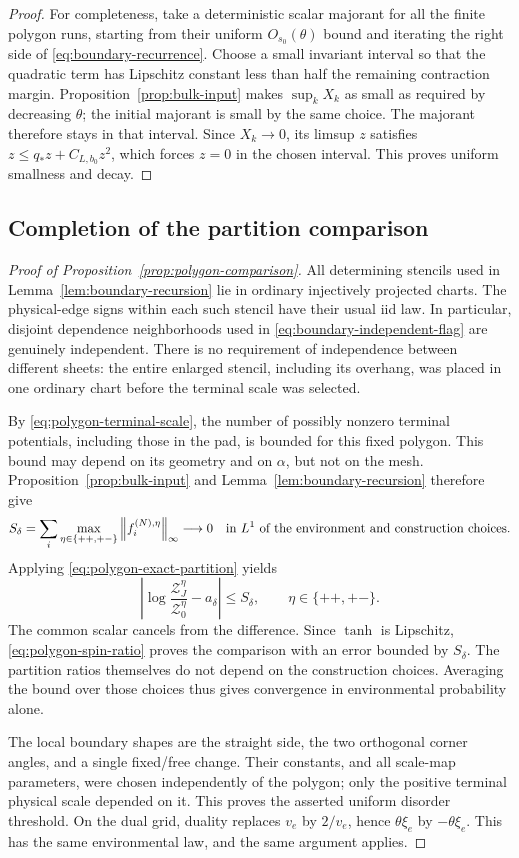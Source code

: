 \begin{proof}
For completeness, take a deterministic scalar majorant for all the
finite polygon runs, starting from their uniform $O_{s_0}(\theta)$
bound and iterating the right side of
\eqref{eq:boundary-recurrence}.  Choose a small invariant interval so
that the quadratic term has Lipschitz constant less than half the
remaining contraction margin.  Proposition~\ref{prop:bulk-input}
makes $\sup_kX_k$ as small as required by decreasing $\theta$; the
initial majorant is small by the same choice.  The majorant therefore
stays in that interval.  Since $X_k\to0$, its limsup $z$ satisfies
$z\le q_*z+C_{L,b_0}z^2$, which forces $z=0$ in the chosen interval.
This proves uniform smallness and decay.
\end{proof}

\subsection{Completion of the partition comparison}

\begin{proof}[Proof of Proposition~\ref{prop:polygon-comparison}]
All determining stencils used in Lemma~\ref{lem:boundary-recursion}
lie in ordinary injectively projected charts.  The physical-edge
signs within each such stencil have their usual iid law.  In
particular, disjoint dependence neighborhoods used in
\eqref{eq:boundary-independent-flag} are genuinely independent.
There is no requirement of independence between different sheets:
the entire enlarged stencil, including its overhang, was placed in
one ordinary chart before the terminal scale was selected.

By \eqref{eq:polygon-terminal-scale}, the number of possibly nonzero
terminal potentials, including those in the pad, is bounded for this
fixed polygon.  This bound may depend on its geometry and on
$\alpha$, but not on the mesh.  Proposition~\ref{prop:bulk-input} and
Lemma~\ref{lem:boundary-recursion} therefore give
\[
 S_\delta=\sum_i\max_{\eta\in\{++, +-\}}
                 \left\lVert f_i^{(N),\eta}\right\rVert_\infty
 \longrightarrow0
 \quad\text{in }L^1\text{ of the environment and construction choices}.
\]
Applying \eqref{eq:polygon-exact-partition} yields
\[
 \left|\log\frac{\mathcal Z_J^\eta}{\mathcal Z_0^\eta}
                      -a_\delta\right|\le S_\delta,
 \qquad \eta\in\{++, +-\}.
\]
The common scalar cancels from the difference.  Since $\tanh$ is
Lipschitz, \eqref{eq:polygon-spin-ratio} proves the comparison with an
error bounded by $S_\delta$.  The partition ratios themselves do not
depend on the construction choices.  Averaging the bound over those
choices thus gives convergence in environmental probability alone.

The local boundary shapes are the straight side, the two orthogonal
corner angles, and a single fixed/free change.  Their constants, and
all scale-map parameters, were chosen independently of the polygon;
only the positive terminal physical scale depended on it.  This
proves the asserted uniform disorder threshold.  On the dual grid,
duality replaces $v_e$ by $2/v_e$, hence $\theta\xi_e$ by
$-\theta\xi_e$.  This has the same environmental law, and the same
argument applies.
\end{proof}
